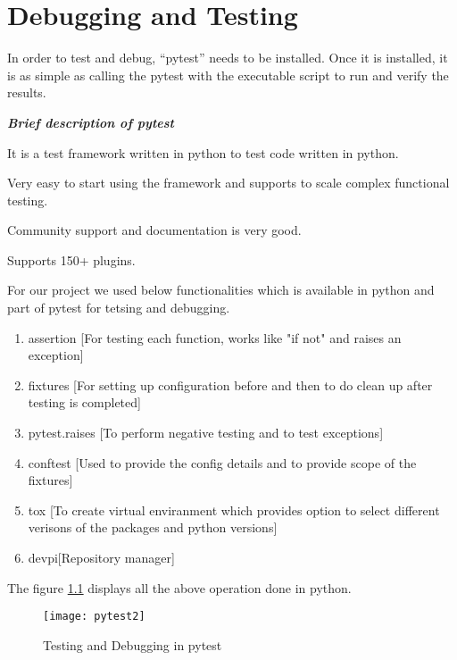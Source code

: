 \chapter{Debugging and Testing}

In order to test and debug, ``pytest'' needs to be installed. Once it is installed, it is as simple as calling the pytest with the executable script to run and verify the results. 

\textbf{\textit{Brief description of pytest}}

 It is a test framework written in python to test code written in python.

Very easy to start using the framework and supports to scale complex functional testing.

Community support and documentation is very good.

Supports 150+ plugins.



For our project we used below functionalities which is available in python and part of pytest for tetsing and debugging.

\begin{enumerate}
    \item assertion  [For testing each function, works like "if not" and raises an exception]
    \item fixtures  [For setting up configuration before and then to do clean up after testing is completed] 
    \item pytest.raises [To perform negative testing and to test exceptions] 
    \item conftest [Used to provide the config details and to provide scope of the fixtures]
    \item tox [To create virtual enviranment which provides option to select different verisons of the packages and python versions]
    \item devpi[Repository manager]
\end{enumerate}

The figure \ref{fig:14} displays all the above operation done in python.


\newpage

\begin{figure}[h]
    \centering
    \texttt{[image: pytest2]}
    \caption{Testing and Debugging in pytest}
    \label{fig:14}
\end{figure}

\newpage